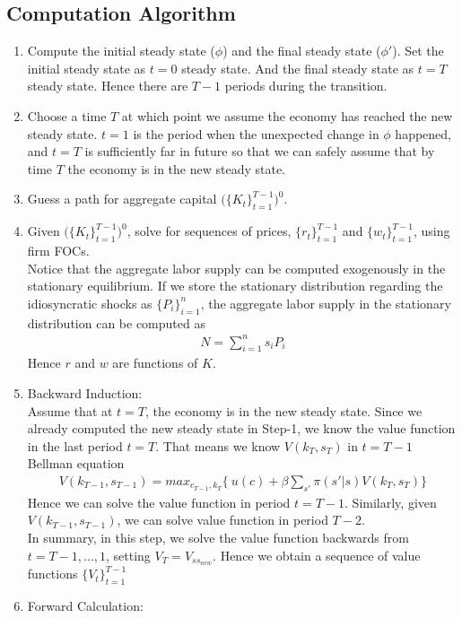\documentclass{article}
\begin{document}
\begin{spacing}{1.5}
\section{Computation Algorithm}
\setlength{\parindent}{2em}
\begin{enumerate}
\item Compute the initial steady state ($\phi$) and the final steady state ($\phi'$). Set the initial steady state as $t=0$ steady state. And the final steady state as $t=T$ steady state. Hence there are $T-1$ periods during the transition.
\item Choose a time $T$ at which point we assume the economy has reached the new steady state. $t=1$ is the period when the unexpected change in $\phi$ happened, and $t=T$ is sufficiently far in future so that we can safely assume that by time $T$ the economy is in the new steady state.
\item Guess a path for aggregate capital $\Big(\{K_t\}_{t=1}^{T-1}\Big)^0$. 
\item Given $\Big(\{K_t\}_{t=1}^{T-1}\Big)^0$, solve for sequences of prices, $\{r_t\}_{t=1}^{T-1}$ and $\{w_t\}_{t=1}^{T-1}$, using firm FOCs. \\
Notice that the aggregate labor supply can be computed exogenously in the stationary equilibrium. If we store the stationary distribution regarding the idiosyncratic shocks as $\{P_i\}_{i=1}^{n}$, the aggregate labor supply in the stationary distribution can be computed as
\begin{align*}
N=\sum_{i=1}^ns_iP_i
\end{align*}
Hence $r$ and $w$ are functions of $K$.
\item Backward Induction:\\
Assume that at $t=T$, the economy is in the new steady state. Since we already computed the new steady state in Step-1, we know the value function in the last period $t=T$. That means we know $V(k_T,s_T)$ in $t=T-1$ Bellman equation
\begin{align*}
V(k_{T-1},s_{T-1})=max_{c_{T-1},k_{T}}\Big\{ \ u(c)+\beta\sum_{s'}\pi(s'|s)V(k_T,s_T)\Big\}
\end{align*}
Hence we can solve the value function in period $t=T-1$. Similarly, given $V(k_{T-1},s_{T-1})$, we can solve value function in period $T-2$.\\
In summary, in this step, we solve the value function backwards from $t=T-1,...,1$, setting $V_T=V_{ss_{new}}$. Hence we obtain a sequence of value functions $\{V_t\}_{t=1}^{T-1}$ 
\item Forward Calculation:\\

\end{enumerate}
\end{spacing}
\end{document}
